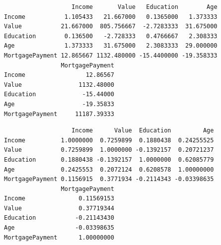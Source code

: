 \begin{Shaded}
\begin{Highlighting}[]
\end{Highlighting}
\end{Shaded}

\begin{verbatim}
                   Income       Value   Education        Age
Income           1.105433   21.667000   0.1365000   1.373333
Value           21.667000  805.756667  -2.7283333  31.675000
Education        0.136500   -2.728333   0.4766667   2.308333
Age              1.373333   31.675000   2.3083333  29.000000
MortgagePayment 12.865667 1132.480000 -15.4400000 -19.358333
                MortgagePayment
Income                 12.86567
Value                1132.48000
Education             -15.44000
Age                   -19.35833
MortgagePayment     11187.39333
\end{verbatim}

\begin{Shaded}
\begin{Highlighting}[]
\end{Highlighting}
\end{Shaded}

\begin{verbatim}
                   Income      Value  Education         Age
Income          1.0000000  0.7259899  0.1880438  0.24255525
Value           0.7259899  1.0000000 -0.1392157  0.20721237
Education       0.1880438 -0.1392157  1.0000000  0.62085779
Age             0.2425553  0.2072124  0.6208578  1.00000000
MortgagePayment 0.1156915  0.3771934 -0.2114343 -0.03398635
                MortgagePayment
Income               0.11569153
Value                0.37719344
Education           -0.21143430
Age                 -0.03398635
MortgagePayment      1.00000000
\end{verbatim}

\begin{Shaded}
\begin{Highlighting}[]



\NormalTok{(}
\NormalTok{  , } 
\NormalTok{  , } 
\NormalTok{  , } 
\NormalTok{  , } 
\NormalTok{  , } 
\NormalTok{  , } 
\NormalTok{  , } 
\NormalTok{  , } 
\NormalTok{  , } 
\NormalTok{  , }
\NormalTok{)}
\end{Highlighting}
\end{Shaded}

